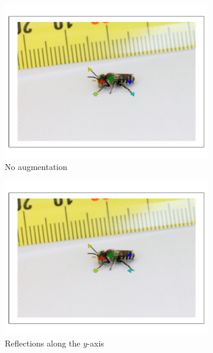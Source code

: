 \documentclass[11pt, oneside]{report}
\begin{document}
        \begin{figure}[p]
            \centering
            \begin{subfigure}[b]{0.45\textwidth}
                \centering
                \includegraphics[width=\textwidth]{7p_3.pdf}
                \caption{No augmentation}
            \end{subfigure}
            \begin{subfigure}[b]{0.45\textwidth}
                \centering
                \includegraphics[width=\textwidth]{refl_3.pdf}
                \caption{Reflections along the $y$-axis}
            \end{subfigure}
            \begin{subfigure}[b]{0.45\textwidth}

\end{subfigure}
\end{figure}
\end{document}
